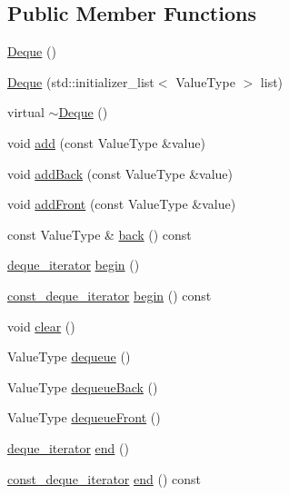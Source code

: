 \subsection*{Public Member Functions}
\begin{DoxyCompactItemize}
\item 
\mbox{\hyperlink{classDeque_a41ebad440badfe713f3ffbbec2eac93f}{Deque}} ()
\item 
\mbox{\hyperlink{classDeque_a68fd6ae6ef9283c882d90c6924e932cd}{Deque}} (std\+::initializer\+\_\+list$<$ Value\+Type $>$ list)
\item 
virtual \mbox{\hyperlink{classDeque_a9d75ae227f70523957cb9b60283d9390}{$\sim$\+Deque}} ()
\item 
void \mbox{\hyperlink{classDeque_ab901606bf3a8019c986f0cf9a9f298dc}{add}} (const Value\+Type \&value)
\item 
void \mbox{\hyperlink{classDeque_a0c733f31bccadf80a6793490b115bd37}{add\+Back}} (const Value\+Type \&value)
\item 
void \mbox{\hyperlink{classDeque_a1d5c5f74583e2a0fcd33f177ecbb9aa4}{add\+Front}} (const Value\+Type \&value)
\item 
const Value\+Type \& \mbox{\hyperlink{classDeque_adc761c91bdacd01bed5c96e25fd9486a}{back}} () const
\item 
\mbox{\hyperlink{classDeque_1_1deque__iterator}{deque\+\_\+iterator}} \mbox{\hyperlink{classDeque_ab0616f247b41eeb1a672421386fd5612}{begin}} ()
\item 
\mbox{\hyperlink{classDeque_1_1const__deque__iterator}{const\+\_\+deque\+\_\+iterator}} \mbox{\hyperlink{classDeque_a92be94822f29cf2d75f992e50763f34d}{begin}} () const
\item 
void \mbox{\hyperlink{classDeque_ac8bb3912a3ce86b15842e79d0b421204}{clear}} ()
\item 
Value\+Type \mbox{\hyperlink{classDeque_aaee07e371e2370e76e6c42bada727ba2}{dequeue}} ()
\item 
Value\+Type \mbox{\hyperlink{classDeque_a0f7233390ba171bc0897e5f9618ac4a6}{dequeue\+Back}} ()
\item 
Value\+Type \mbox{\hyperlink{classDeque_aecf002fe82a60407f6008f6fd7ac2c27}{dequeue\+Front}} ()
\item 
\mbox{\hyperlink{classDeque_1_1deque__iterator}{deque\+\_\+iterator}} \mbox{\hyperlink{classDeque_a3f00605ada70bb4af841bafa03311f4a}{end}} ()
\item 
\mbox{\hyperlink{classDeque_1_1const__deque__iterator}{const\+\_\+deque\+\_\+iterator}} \mbox{\hyperlink{classDeque_a255e9712f118c564977def0bdb6438a2}{end}} () const

\end{DoxyCompactItemize}
